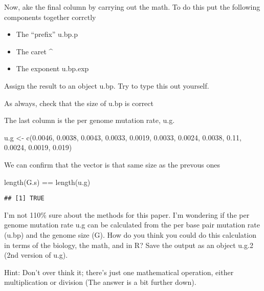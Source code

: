 \documentclass[
]{book}
\newenvironment{Shaded}{\begin{snugshade}}{\end{snugshade}}
\newcommand{\FloatTok}[1]{\textcolor[rgb]{0.00,0.00,0.81}{#1}}
\newcommand{\FunctionTok}[1]{\textcolor[rgb]{0.00,0.00,0.00}{#1}}
\newcommand{\NormalTok}[1]{#1}
\newcommand{\OtherTok}[1]{\textcolor[rgb]{0.56,0.35,0.01}{#1}}
\newcommand{\SpecialCharTok}[1]{\textcolor[rgb]{0.00,0.00,0.00}{#1}}
\providecommand{\tightlist}{%
  \setlength{\itemsep}{0pt}\setlength{\parskip}{0pt}}
\begin{document}
Now, ake the final column by carrying out the math. To do this put the following components together corrctly

\begin{itemize}
\tightlist
\item
  The ``prefix'' u.bp.p
\item
  The caret \^{}
\item
  The exponent u.bp.exp
\end{itemize}

Assign the result to an object u.bp. Try to type this out yourself.

As always, check that the size of u.bp is correct

The last column is the per genome mutation rate, u.g.

\begin{Shaded}
\begin{Highlighting}[]
\NormalTok{u.g }\OtherTok{\textless{}{-}} \FunctionTok{c}\NormalTok{(}\FloatTok{0.0046}\NormalTok{, }\FloatTok{0.0038}\NormalTok{, }\FloatTok{0.0043}\NormalTok{, }
         \FloatTok{0.0033}\NormalTok{, }\FloatTok{0.0019}\NormalTok{, }\FloatTok{0.0033}\NormalTok{, }
         \FloatTok{0.0024}\NormalTok{, }\FloatTok{0.0038}\NormalTok{, }\FloatTok{0.11}\NormalTok{,}
         \FloatTok{0.0024}\NormalTok{, }\FloatTok{0.0019}\NormalTok{, }\FloatTok{0.019}\NormalTok{)}
\end{Highlighting}
\end{Shaded}

We can confirm that the vector is that same size as the prevous ones

\begin{Shaded}
\begin{Highlighting}[]
\FunctionTok{length}\NormalTok{(G.s) }\SpecialCharTok{==} \FunctionTok{length}\NormalTok{(u.g)}
\end{Highlighting}
\end{Shaded}

\begin{verbatim}
## [1] TRUE
\end{verbatim}

I'm not 110\% sure about the methods for this paper. I'm wondering if the per genome mutation rate u.g can be calculated from the per base pair mutation rate (u.bp) and the genome size (G). How do you think you could do this calculation in terms of the biology, the math, and in R? Save the output as an object u.g.2 (2nd version of u.g).

Hint: Don't over think it; there's just one mathematical operation, either multiplication or division (The answer is a bit further down).
\end{document}

